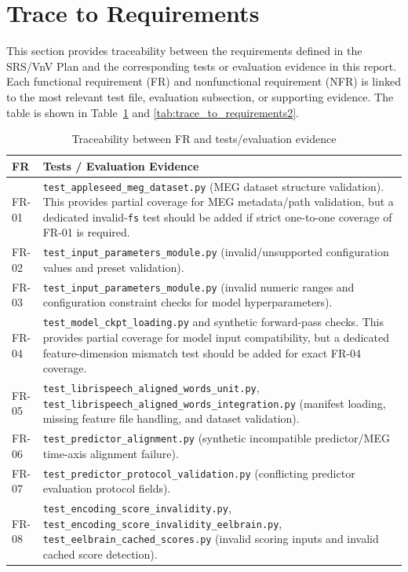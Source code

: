 \documentclass[12pt, titlepage]{article}
\begin{document}
		
\section{Trace to Requirements}

This section provides traceability between the requirements defined in the SRS/VnV Plan and the corresponding tests or evaluation evidence in this report.
Each functional requirement (FR) and nonfunctional requirement (NFR) is linked to the most relevant test file, evaluation subsection, or supporting evidence.
The table is shown in Table~\ref{tab:trace_to_requirements1} and \ref{tab:trace_to_requirements2}.

\begin{table}[h]
\centering
\caption{Traceability between FR and tests/evaluation evidence}
\label{tab:trace_to_requirements1}
\begin{tabularx}{0.96\textwidth}{p{2.0cm}X}
\toprule
\textbf{FR} & \textbf{Tests / Evaluation Evidence} \\
\midrule

FR-01 & \texttt{test\_appleseed\_meg\_dataset.py} (MEG dataset structure validation). This provides partial coverage for MEG metadata/path validation, but a dedicated invalid-\texttt{fs} test should be added if strict one-to-one coverage of FR-01 is required. \\

FR-02 & \texttt{test\_input\_parameters\_module.py} (invalid/unsupported configuration values and preset validation). \\

FR-03 & \texttt{test\_input\_parameters\_module.py} (invalid numeric ranges and configuration constraint checks for model hyperparameters). \\

FR-04 & \texttt{test\_model\_ckpt\_loading.py} and synthetic forward-pass checks. This provides partial coverage for model input compatibility, but a dedicated feature-dimension mismatch test should be added for exact FR-04 coverage. \\

FR-05 & \texttt{test\_librispeech\_aligned\_words\_unit.py}, \texttt{test\_librispeech\_aligned\_words\_integration.py} (manifest loading, missing feature file handling, and dataset validation). \\

FR-06 & \texttt{test\_predictor\_alignment.py} (synthetic incompatible predictor/MEG time-axis alignment failure). \\

FR-07 & \texttt{test\_predictor\_protocol\_validation.py} (conflicting predictor evaluation protocol fields). \\

FR-08 & \texttt{test\_encoding\_score\_invalidity.py}, \texttt{test\_encoding\_score\_invalidity\_eelbrain.py}, \texttt{test\_eelbrain\_cached\_scores.py} (invalid scoring inputs and invalid cached score detection). \\


\bottomrule
\end{tabularx}
\end{table}
\end{document}
